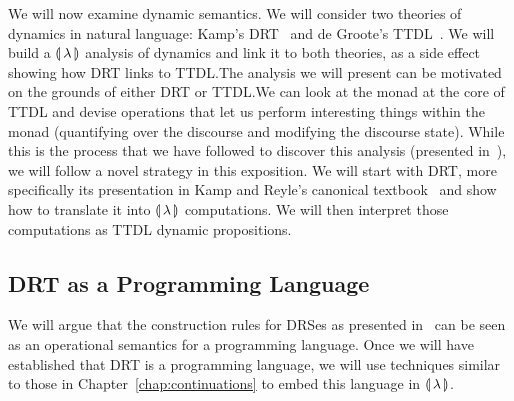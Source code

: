 We will now examine dynamic semantics. We will consider two theories of
dynamics in natural language: Kamp's DRT~\cite{kamp1993discourse} and de
Groote's TTDL~\cite{de2006towards}. We will build a $\llparenthesis \, \lambda \, \rrparenthesis$
analysis of dynamics and link it to both theories, as a side effect showing
how DRT links to TTDL.\@ The analysis we will present can be motivated on
the grounds of either DRT or TTDL.\@ We can look at the monad at the core
of TTDL and devise operations that let us perform interesting things within
the monad (quantifying over the discourse and modifying the discourse
state). While this is the process that we have followed to discover this
analysis (presented in~\cite{marsik2014algebraic}), we will follow a novel
strategy in this exposition. We will start with DRT, more specifically its
presentation in Kamp and Reyle's canonical
textbook~\cite{kamp1993discourse} and show how to translate it into
$\llparenthesis \, \lambda \, \rrparenthesis$ computations. We will then interpret those computations
as TTDL dynamic propositions.


\subsection{DRT as a Programming Language}
\label{ssec:drt-as-pl}

We will argue that the construction rules for DRSes as presented
in~\cite{kamp1993discourse} can be seen as an operational semantics for a
programming language. Once we will have established that DRT is a
programming language, we will use techniques similar to those in
Chapter~\ref{chap:continuations} to embed this language in
$\llparenthesis \, \lambda \, \rrparenthesis$.

\vspace{6mm}


